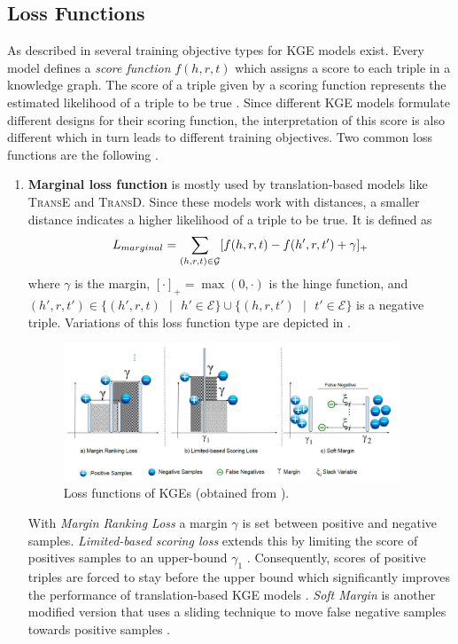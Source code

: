 \subsection{Loss Functions} 
\label{subsec:loss_functions}
%
As described in \cite{cai2017kbgan} several training objective types for \ac{KGE} models exist.
Every model defines a \textit{score function} $f(h,r,t)$ which assigns a score to each triple  in a knowledge graph.
The score of a triple given by a scoring function represents the estimated likelihood of a triple to be true \cite{cai2017kbgan}.
Since different \ac{KGE} models formulate different designs for their scoring function, the interpretation of this score is also different which in turn leads to different training objectives.
Two common loss functions are the following \cite{cai2017kbgan}.
\begin{enumerate}
    \item 
    \textbf{Marginal loss function} is mostly used by translation-based models like \textsc{TransE} and \textsc{TransD}.
    Since these models work with distances, a smaller distance indicates a higher likelihood of a triple to be true.
    It is defined as 
    \begin{equation}
        L_{marginal}=\sum_{(h,r,t)\in\mathcal{G}}[f(h,r,t)-f(h',r,t')+\gamma]_+\label{eq:marginalloss}
    \end{equation}
    where $\gamma$ is the margin, $[\cdot]_+=\max(0, \cdot)$ is the hinge function, and $(h',r,t') \in \{(h',r,t)\text{ }|\text{ }h' \in \mathcal{E}\} \cup \{(h,r,t')\text{ }|\text{ }t' \in \mathcal{E}\}$ is a negative triple.
    Variations of this loss function type are depicted in .
    \begin{figure}[t]
      \centering
        \includegraphics[width=0.95\textwidth]{figures/loss_functions.PNG}
      \caption{Loss functions of \acp{KGE} (obtained from \cite{9207513}).}
      \label{fig:loss_functions}
    \end{figure}
    With \textit{Margin Ranking Loss} a margin $\gamma$ is set between positive and negative samples.
    \textit{Limited-based scoring loss} extends this by limiting the score of positives samples to an upper-bound $\gamma_1$ \cite{9207513}.
    Consequently, scores of positive triples are forced to stay before the upper bound which
    significantly improves the performance of translation-based KGE models \cite{9207513}.
    \textit{Soft Margin} is another modified version that uses a sliding technique to move false negative samples towards positive samples \cite{9207513}.     
    

\end{enumerate}
